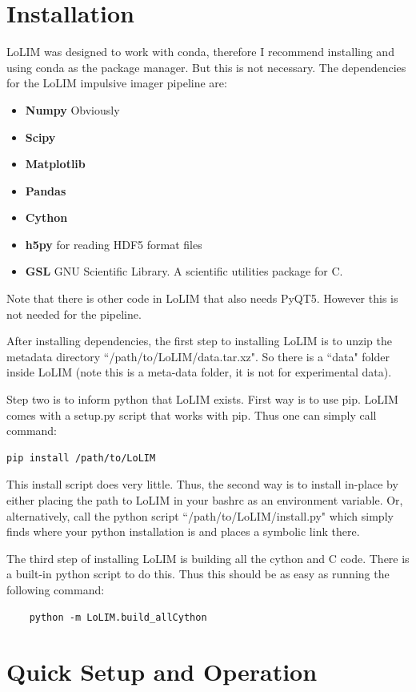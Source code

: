 \documentclass[]{article}
\begin{document}
\section{Installation}

LoLIM was designed to work with conda, therefore I recommend installing and using conda as the package manager. But this is not necessary. The dependencies for the LoLIM impulsive imager pipeline are:
\begin{itemize}
	\item \textbf{Numpy} Obviously
	\item \textbf{Scipy} 
	\item \textbf{Matplotlib}
	\item \textbf{Pandas} 
	\item \textbf{Cython}
	\item \textbf{h5py} for reading HDF5 format files  
	\item \textbf{GSL}  GNU Scientific Library. A scientific utilities package for C.
\end{itemize}
Note that there is other code in LoLIM that also needs PyQT5. However this is not needed for the pipeline.

After installing dependencies, the first step to installing LoLIM is to unzip the metadata directory ``/path/to/LoLIM/data.tar.xz". So there is a ``data" folder inside LoLIM (note this is a meta-data folder, it is not for experimental data).

Step two is to inform python that LoLIM exists. First way is to use pip. LoLIM comes with a setup.py script that works with pip. Thus one can simply call command:
\begin{verbatim}
pip install /path/to/LoLIM
\end{verbatim}
This install script does very little. Thus, the second way is to install in-place by either placing the path to LoLIM in your bashrc as an environment variable. Or, alternatively, call the python script ``/path/to/LoLIM/install.py" which simply finds where your python installation is and places a symbolic link there.

The third  step of installing LoLIM is building all the cython and C code. There is a built-in python script to do this. Thus this should be as easy as running the following command:
\begin{verbatim}
	python -m LoLIM.build_allCython 
\end{verbatim}




\section{Quick Setup and Operation}
\end{document}
